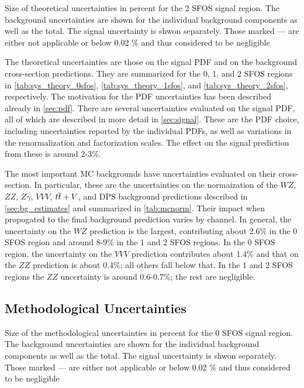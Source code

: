 \begin{table}[ht]
\centering

\caption{Size of theoretical uncertainties in percent for the 2 SFOS signal region. The background uncertainties are shown for the individual background components as well as the total. The signal uncertainty is shwon separately. Those marked --- are either not applicable or below 0.02 \% and thus considered to be negligible}
\label{tab:sys_theory_2sfos}
\end{table}

The theoretical uncertainties are those on the signal PDF and 
on the background cross-section predictions.
They are summarized for the 0, 1, and 2 SFOS regions
in \tab\ref{tab:sys_theory_0sfos}, 
\tab\ref{tab:sys_theory_1sfos}, and
\tab\ref{tab:sys_theory_2sfos}, respectively.
The motivation for the PDF uncertainties has been described
already in \sec\ref{sec:pdf}. 
There are several uncertainties evaluated on the signal PDF, all of which
are described in more detail in \sec\ref{sec:signal}. These
are the PDF choice, including uncertainties reported by the individual
PDFs, as well as variations in the renormalization and factorization scales.
The effect on the signal prediction from these is around 2-3\%.

The most important MC backgrounds have uncertainties evaluated on their
cross-section.  In particular, these are the uncertainties on the 
normaization of the $WZ$, $ZZ$, $Z\gamma$, $VVV$, $t\overline{t}+V$, 
and DPS background predictions
described in \sec\ref{sec:bg_estimates} and summarized in \tab\ref{tab:mcnorm}.
Their impact when propogated to the final background prediction
varies by channel. In general, the uncertainty on the $WZ$ prediction is the 
largest, contributing about 2.6\% in the 0 SFOS region and around 8-9\%
in the 1 and 2 SFOS regions.  In the 0 SFOS region, the uncertainty 
on the $VVV$ prediction contributes about 1.4\% and that on the $ZZ$ prediction
is about 0.4\%; all others fall below that. 
In the 1 and 2 SFOS regions the $ZZ$ uncertainty is around 0.6-0.7\%; the
rest are negligible. 

\subsection{Methodological Uncertainties}

\begin{table}[ht!]
\centering

\caption{Size of the methodological uncertainties in percent for the 0 SFOS signal region. The background uncertainties are shown for the individual background components as well as the total. The signal uncertainty is shwon separately. Those marked --- are either not applicable or below 0.02 \% and thus considered to be negligible}
\label{tab:sys_meth_0sfos}
\end{table}

